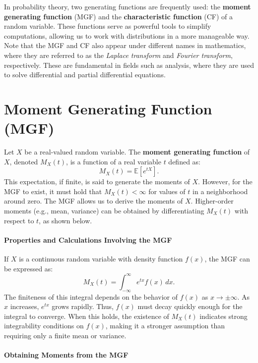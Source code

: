 
In probability theory, two generating functions are frequently used: the \textbf{moment generating function} (MGF) and the \textbf{characteristic function} (CF) of a random variable. These functions serve as powerful tools to simplify computations, allowing us to work with distributions in a more manageable way. \newline
Note that the MGF and CF also appear under different names in mathematics, where they are referred to as the \emph{Laplace transform} and \emph{Fourier transform}, respectively. These are fundamental in fields such as analysis, where they are used to solve differential and partial differential equations.

\section{Moment Generating Function (MGF)}
Let \( X \) be a real-valued random variable. The \textbf{moment generating function} of \( X \), denoted \( M_X(t) \), is a function of a real variable \( t \) defined as:
\[
M_X(t) = \mathbb{E}\left[ e^{tX} \right].
\]
This expectation, if finite, is said to generate the moments of \( X \). However, for the MGF to exist, it must hold that \( M_X(t) < \infty \) for values of \( t \) in a neighborhood around zero. \newline
The MGF allows us to derive the moments of \( X \). Higher-order moments (e.g., mean, variance) can be obtained by differentiating \( M_X(t) \) with respect to \( t \), as shown below.

\paragraph{Properties and Calculations Involving the MGF}

If \( X \) is a continuous random variable with density function \( f(x) \), the MGF can be expressed as:
\[
M_X(t) = \int_{-\infty}^{\infty} e^{tx} f(x) \, dx.
\]
The finiteness of this integral depends on the behavior of \( f(x) \) as \( x \to \pm \infty \). \newline
As \( x \) increases, \( e^{tx} \) grows rapidly. Thus, \( f(x) \) must decay quickly enough for the integral to converge. When this holds, the existence of \( M_X(t) \) indicates strong integrability conditions on \( f(x) \), making it a stronger assumption than requiring only a finite mean or variance.

\paragraph{Obtaining Moments from the MGF}

